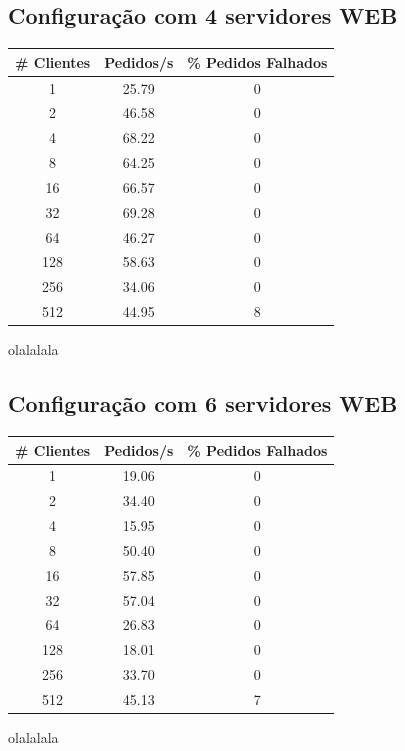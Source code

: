 

\subsection{Configuração com 4 servidores WEB}


\begin{tabular}{|c|c|c|}
\hline
\textbf{\# Clientes} & \textbf{Pedidos/s} & \textbf{\% Pedidos Falhados} \\ \hline
1 & 25.79 & 0 \\ \hline
2 & 46.58 & 0 \\ \hline
4 & 68.22 & 0 \\ \hline
8 & 64.25 & 0 \\ \hline
16 & 66.57 & 0 \\ \hline
32 & 69.28 & 0 \\ \hline
64 & 46.27 & 0 \\ \hline
128 & 58.63 & 0 \\ \hline
256 & 34.06 & 0 \\ \hline
512 & 44.95 & 8 \\ \hline

\end{tabular}

olalalala


\subsection{Configuração com 6 servidores WEB}


\begin{tabular}{|c|c|c|}
\hline
\textbf{\# Clientes} & \textbf{Pedidos/s} & \textbf{\% Pedidos Falhados} \\ \hline
1 & 19.06 & 0 \\ \hline
2 & 34.40 & 0 \\ \hline
4 & 15.95 & 0 \\ \hline
8 & 50.40 & 0 \\ \hline
16 & 57.85 & 0 \\ \hline
32 & 57.04 & 0 \\ \hline
64 & 26.83 & 0 \\ \hline
128 & 18.01 & 0 \\ \hline
256 & 33.70 & 0 \\ \hline
512 & 45.13 & 7 \\ \hline

\end{tabular}

olalalala
